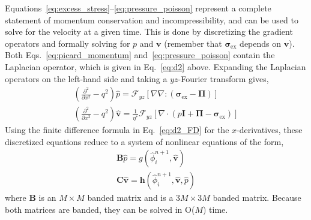 \documentclass[journal=mamobx,manuscript=suppinfo]{achemso}
\newcommand{\ex}{\mathrm{ex}}
\begin{document}
Equations~\ref{eq:excess_stress}--\ref{eq:pressure_poisson} represent a complete statement of momentum conservation and incompressibility, and can be used to solve for the velocity at a given time\footnotemark{}.%
This is done by discretizing the gradient operators and formally solving for $p$ and $\bm{v}$ (remember that $\bm{\sigma}_{\ex}$ depends on $\bm{v}$).
Both Eqs.~\ref{eq:picard_momentum} and~\ref{eq:pressure_poisson} contain the Laplacian operator, which is given in Eq.~\ref{eq:d2} above.
Expanding the Laplacian operators on the left-hand side and taking a $yz$-Fourier transform gives,
\begin{gather}
  \left ( \frac{\partial^2}{\partial x^2} - q^{2} \right ) \hat{p} =  \mathcal{F}_{yz} \left [ \nabla \nabla : \left ( \bm{\sigma}_{\ex} - \bm{\Pi} \right ) \right ] \\
  \left ( \frac{\partial^2}{\partial x^2} - q^{2} \right ) \hat{\bm{v}} =  \frac{1}{\eta^{*}} \mathcal{F}_{yz} \left [ \nabla \cdot \left ( p\bm{I} + \bm{\Pi} - \bm{\sigma}_{\ex} \right ) \right ]
\end{gather}
Using the finite difference formula in Eq.~\ref{eq:d2_FD} for the $x$-derivatives, these discretized equations reduce to a system of nonlinear equations of the form,
\begin{gather} 
\bm{B} \hat{p} = g(\hat{\phi}_{i}^{n+1}, \hat{\bm{v}}) \\
\bm{C} \hat{\bm{v}} = \bm{h}(\hat{\phi}_{i}^{n+1}, \hat{\bm{v}}, \hat{p})
\end{gather}
where $\bm{B}$ is an $M \times M$ banded matrix and  is a $3M \times 3M$ banded matrix.
Because both matrices are banded, they can be solved in O($M$) time.
\end{document}
